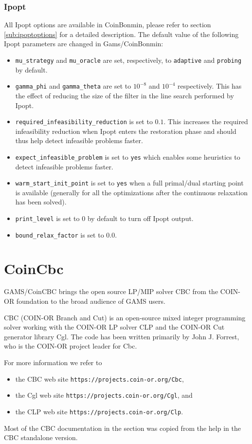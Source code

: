 \subsubsection{Ipopt}
All Ipopt options are available in CoinBonmin, please refer to section \ref{sub:ipoptoptions} for a detailed description.
The default value of the following Ipopt parameters are changed in Gams/CoinBonmin:
\begin{itemize}
\item \texttt{mu\_strategy} and \texttt{mu\_oracle} are set, respectively, to {\tt adaptive} and {\tt probing} by default.
\item \texttt{gamma\_phi} and \texttt{gamma\_theta} are set to $10^{-8}$ and $10^{-4}$ respectively. This has the effect of reducing the size of the filter in the line search performed by Ipopt.
\item \texttt{required\_infeasibility\_reduction} is set to $0.1$.
This increases the required infeasibility reduction when Ipopt enters the restoration phase and should thus help
detect infeasible problems faster.
\item \texttt{expect\_infeasible\_problem} is set to {\tt yes} which enables some heuristics to detect infeasible problems faster.
\item \texttt{warm\_start\_init\_point} is set to {\tt yes} when a full primal/dual starting point is available (generally for all the optimizations after the continuous relaxation has been solved).
\item \texttt{print\_level} is set to $0$ by default to turn off Ipopt output.
\item \texttt{bound\_relax\_factor} is set to $0.0$.
\end{itemize}

\section{CoinCbc}
\label{sec:coincbc}
\hypertarget{sec:coincbc}{}

GAMS/CoinCBC brings the open source LP/MIP solver CBC from the COIN-OR foundation to the broad audience of GAMS users.

CBC (COIN-OR Branch and Cut) is an open-source mixed integer programming solver working with the COIN-OR LP solver CLP and the COIN-OR Cut generator library Cgl.
The code has been written primarily by John J. Forrest, who is the COIN-OR project leader for Cbc.

For more information we refer to
\begin{itemize}
\item the CBC web site \texttt{https://projects.coin-or.org/Cbc},
\item the Cgl web site \texttt{https://projects.coin-or.org/Cgl}, and
\item the CLP web site \texttt{https://projects.coin-or.org/Clp}.
\end{itemize}
Most of the CBC documentation in the section was copied from the help in the CBC standalone version.


